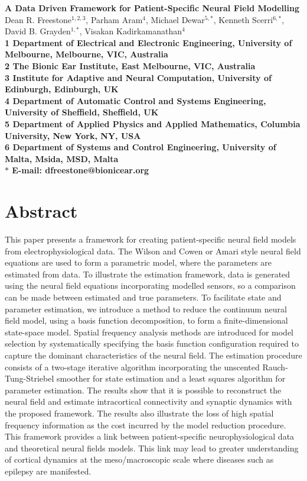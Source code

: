 \documentclass[10pt]{article}
\date{}
\begin{document}
\begin{flushleft}
{\Large
\textbf{A Data Driven Framework for Patient-Specific Neural Field Modelling}
}
\\
Dean R. Freestone$^{1,2,3}$, 
Parham Aram$^{4}$, 
Michael Dewar$^{5,\ast}$,
Kenneth Scerri$^{6,\ast}$,
David B. Grayden$^{1,\ast}$,
Visakan Kadirkamanathan$^{4}$
\\
\bf{1} Department of Electrical and Electronic Engineering, University of Melbourne, Melbourne, VIC, Australia
\\
\bf{2} The Bionic Ear Institute, East Melbourne, VIC, Australia
\\
\bf{3} Institute for Adaptive and Neural Computation, University of Edinburgh, Edinburgh, UK
\\
\bf{4} Department of Automatic Control and Systems Engineering, University of Sheffield, Sheffield, UK
\\
\bf{5} Department of Applied Physics and Applied Mathematics, Columbia University, New York, NY, USA
\\
\bf{6} Department of Systems and Control Engineering, University of Malta, Msida, MSD, Malta
\\
$\ast$ E-mail: dfreestone@bionicear.org
\end{flushleft}

\section*{Abstract}
This paper presents a framework for creating patient-specific neural field models from electrophysiological data. The Wilson and Cowen or Amari style neural field equations are used to form a parametric model, where the parameters are estimated from data. To illustrate the estimation framework, data is generated using the neural field equations incorporating modelled sensors, so a comparison can be made between estimated and true parameters. To facilitate state and parameter estimation, we introduce a method to reduce the continuum neural field model, using a basis function decomposition, to form a finite-dimensional state-space model. Spatial frequency analysis methods are introduced for model selection by systematically specifying the basis function configuration required to capture the dominant characteristics of the neural field. The estimation procedure consists of a two-stage iterative algorithm incorporating the unscented Rauch-Tung-Striebel smoother for state estimation and a least squares algorithm for parameter estimation. The results show that it is possible to reconstruct the neural field and estimate intracortical connectivity and synaptic dynamics with the proposed framework. The results also illustrate the loss of high spatial frequency information as the cost incurred by the model reduction procedure. This framework provides a link between patient-specific neurophysiological data and theoretical neural fields models. This link may lead to greater understanding of cortical dynamics at the meso/macroscopic scale where diseases such as epilepsy are manifested.
\end{document}
